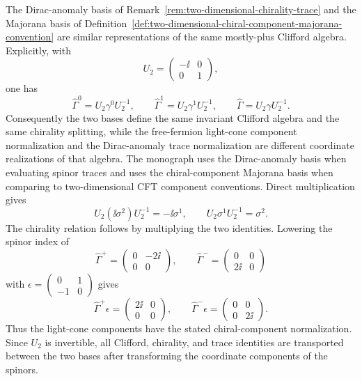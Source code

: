 \begin{remark}
\label{prop:two-dimensional-chiral-component-dirac-compatibility}
The Dirac-anomaly basis of
Remark~\ref{rem:two-dimensional-chirality-trace} and the
Majorana basis of
Definition~\ref{def:two-dimensional-chiral-component-majorana-convention} are
similar representations of the same mostly-plus Clifford algebra.  Explicitly,
with
\[
  U_2=\begin{pmatrix}-\ii&0\\0&1\end{pmatrix},
\]
one has
\[
  \widehat\Gamma^0=U_2\gamma^0U_2^{-1},
  \qquad
  \widehat\Gamma^1=U_2\gamma^1U_2^{-1},
  \qquad
  \widehat\Gamma=U_2\gamma U_2^{-1}.
\]
Consequently the two bases define the same invariant Clifford algebra and the
same chirality splitting, while the free-fermion light-cone component
normalization and the Dirac-anomaly trace normalization are different
coordinate realizations of that algebra.  The monograph uses the
Dirac-anomaly basis when evaluating spinor traces and uses the
chiral-component Majorana basis when comparing to two-dimensional CFT
component conventions.
Direct multiplication gives
\[
  U_2(\ii\sigma^2)U_2^{-1}=-\ii\sigma^1,
  \qquad
  U_2\sigma^1U_2^{-1}=\sigma^2.
\]
The chirality relation follows by multiplying the two identities.  Lowering
the spinor index of
\[
  \widehat\Gamma^+=
  \begin{pmatrix}0&-2\ii\\0&0\end{pmatrix},
  \qquad
  \widehat\Gamma^-=
  \begin{pmatrix}0&0\\2\ii&0\end{pmatrix}
\]
with
\(\epsilon=\begin{pmatrix}0&1\\-1&0\end{pmatrix}\) gives
\[
  \widehat\Gamma^+\epsilon=
  \begin{pmatrix}2\ii&0\\0&0\end{pmatrix},
  \qquad
  \widehat\Gamma^-\epsilon=
  \begin{pmatrix}0&0\\0&2\ii\end{pmatrix}.
\]
Thus the light-cone components have the stated chiral-component
normalization.  Since \(U_2\) is invertible, all Clifford, chirality, and
trace identities are transported between the two bases after transforming the
coordinate components of the spinors.
\end{remark}


